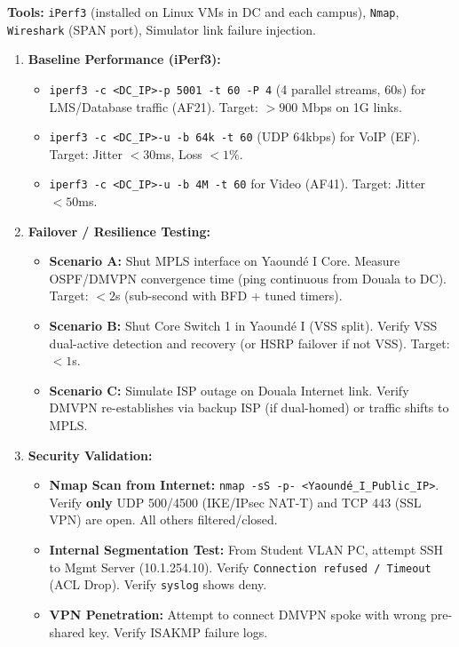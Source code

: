 \documentclass[11pt]{article}
\begin{document}
\begin{experience}
\textbf{Tools:} \texttt{iPerf3} (installed on Linux VMs in DC and each campus), \texttt{Nmap}, \texttt{Wireshark} (SPAN port), Simulator link failure injection.

\begin{enumerate}
    \item \textbf{Baseline Performance (iPerf3):}
\begin{itemize}
    \item \texttt{iperf3 -c \textless DC\_IP\textgreater -p 5001 -t 60 -P 4} (4 parallel streams, 60s) for LMS/Database traffic (AF21). Target: $> 900$ Mbps on 1G links.
    \item \texttt{iperf3 -c \textless DC\_IP\textgreater -u -b 64k -t 60} (UDP 64kbps) for VoIP (EF). Target: Jitter $< 30$ms, Loss $< 1$\%.
    \item \texttt{iperf3 -c \textless DC\_IP\textgreater -u -b 4M -t 60} for Video (AF41). Target: Jitter $< 50$ms.
\end{itemize}
    \item \textbf{Failover / Resilience Testing:}
        \begin{itemize}
            \item \textbf{Scenario A:} Shut MPLS interface on Yaoundé I Core. Measure OSPF/DMVPN convergence time (ping continuous from Douala to DC). Target: $< 2$s (sub-second with BFD + tuned timers).
            \item \textbf{Scenario B:} Shut Core Switch 1 in Yaoundé I (VSS split). Verify VSS dual-active detection and recovery (or HSRP failover if not VSS). Target: $< 1$s.
            \item \textbf{Scenario C:} Simulate ISP outage on Douala Internet link. Verify DMVPN re-establishes via backup ISP (if dual-homed) or traffic shifts to MPLS.
        \end{itemize}
    \item \textbf{Security Validation:}
\begin{itemize}
            \item \textbf{Nmap Scan from Internet:} \texttt{nmap -sS -p- \textless Yaoundé\_I\_Public\_IP\textgreater}. Verify \textbf{only} UDP 500/4500 (IKE/IPsec NAT-T) and TCP 443 (SSL VPN) are open. All others filtered/closed.
            \item \textbf{Internal Segmentation Test:} From Student VLAN PC, attempt SSH to Mgmt Server (10.1.254.10). Verify \texttt{Connection refused / Timeout} (ACL Drop). Verify \texttt{syslog} shows deny.
            \item \textbf{VPN Penetration:} Attempt to connect DMVPN spoke with wrong pre-shared key. Verify ISAKMP failure logs.
        \end{itemize}
\end{enumerate}
\end{experience}
\end{document}
